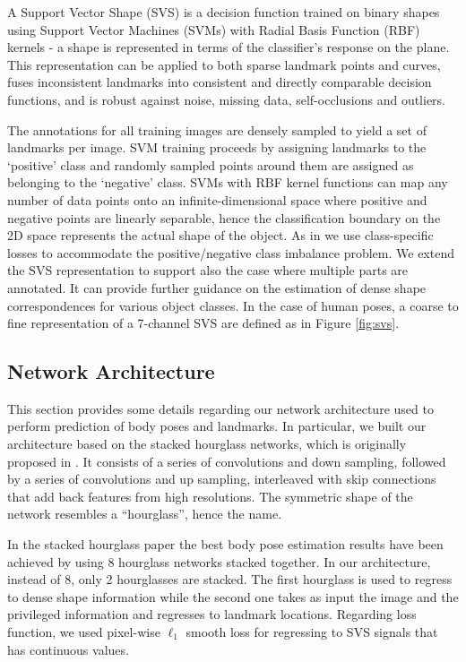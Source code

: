 A Support Vector Shape (SVS) is a decision function trained on binary shapes using Support Vector Machines (SVMs) with Radial Basis Function (RBF) kernels \cite{Nguyen2013} - a shape is represented in terms of the classifier's response on the plane. This representation can be applied to both sparse landmark points and curves,  fuses inconsistent landmarks into consistent and directly comparable decision functions, and is  robust against noise, missing data, self-occlusions and outliers.

The annotations for all training images are densely sampled to yield a set of landmarks per image.  SVM training proceeds by assigning landmarks  to the `positive' class and randomly sampled points around them are assigned as belonging to the `negative' class. SVMs with RBF kernel functions can map any number of data points onto an infinite-dimensional space where positive and negative points are linearly separable, hence the classification boundary on the 2D space represents the actual shape of the object. As in \cite{Nguyen2013} we use class-specific losses to accommodate the positive/negative class imbalance problem. 
We extend the SVS representation to support also the case where multiple parts are annotated. It can provide further guidance on the estimation of dense shape correspondences for various object classes. In the case of human poses, a coarse to fine representation of a 7-channel SVS are defined as in Figure \ref{fig:svs}. 

\subsection{Network Architecture}

This section provides some details regarding our network architecture used to perform prediction of body poses and landmarks. In particular, we built our architecture based on the stacked hourglass networks, which is originally proposed in \cite{newell2016stacked}. It consists of a series of convolutions and down sampling, followed by a series of convolutions and up sampling, interleaved with skip connections that add back features from high resolutions. The symmetric shape of the network resembles a “hourglass”, hence the name.

In the stacked hourglass paper the best body pose estimation results have been achieved by using 8 hourglass networks stacked together. In our architecture, instead of 8, only 2 hourglasses are stacked. The first hourglass is used to regress to dense shape information while the second one takes as input the image and the privileged information and regresses to landmark locations. Regarding loss function, we used pixel-wise $\ell_1$ smooth loss for regressing to SVS signals that has continuous values.

